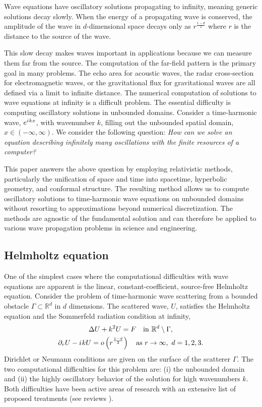\documentclass[onefignum,onetabnum]{siamart190516}
\newcommand{\iu}{{i\mkern1mu}}
\begin{document}
Wave equations have oscillatory solutions propagating to infinity, meaning generic solutions decay slowly. When the energy of a propagating wave is conserved, the amplitude of the wave in $d$-dimensional space decays only as $r^{\frac{1-d}{2}}$ where $r$ is the distance to the source of the wave. 

This slow decay makes waves important in applications because we can measure them far from the source. The computation of the far-field pattern is the primary goal in many problems. The echo area for acoustic waves, the radar cross-section for electromagnetic waves, or the gravitational flux for gravitational waves are all defined via a limit to infinite distance. The numerical computation of solutions to wave equations at infinity is a difficult problem. The essential difficulty is computing oscillatory solutions in unbounded domains. Consider a time-harmonic wave, $e^{\iu k x}$, with wavenumber $k$, filling out the unbounded spatial domain, $x\in(-\infty,\infty)$. We consider the following question: \emph{How can we solve an equation describing infinitely many oscillations with the finite resources of a computer?}

This paper answers the above question by employing relativistic methods, particularly the unification of space and time into spacetime, hyperbolic geometry, and conformal structure. The resulting method allows us to compute oscillatory solutions to time-harmonic wave equations on unbounded domains without resorting to approximations beyond numerical discretization. The methods are agnostic of the fundamental solution and can therefore be applied to various wave propagation problems in science and engineering.


\subsection{Helmholtz equation}
One of the simplest cases where the computational difficulties with wave equations are apparent is the linear, constant-coefficient, source-free Helmholtz equation. Consider the problem of time-harmonic wave scattering from a bounded obstacle $\Gamma \subset \mathbb{R}^d$ in $d$ dimensions. The scattered wave, $U$, satisfies the Helmholtz equation and the Sommerfeld radiation condition at infinity,
\begin{equation}
	\label{eq:helm}
	\begin{gathered}
		\Delta U + k^2 U = F \quad \mathrm{in } \ \mathbb{R}^d\setminus \Gamma, \\
		\partial_r U - \iu k U = o\left(r^{\frac{1-d}{2}}\right) \quad \mathrm{as} \ r\to\infty,\ d=1,2,3.
	\end{gathered}
\end{equation}
Dirichlet or Neumann conditions are given on the surface of the scatterer $\Gamma$. The two computational difficulties for this problem are: (i) the unbounded domain and (ii) the highly oscillatory behavior of the solution for high wavenumbers $k$. Both difficulties have been active areas of research with an extensive list of proposed treatments (see reviews \cite{TSYNKOV1998465, HagstromReview}).
\end{document}
